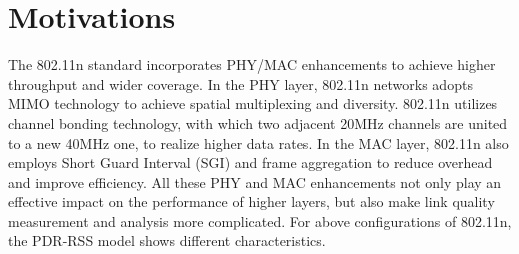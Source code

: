 \documentclass[draftclsnofoot,conference,onecolumn,11pt]{IEEEtran}
\begin{document}
%
%
%
%
%
%

\section{Motivations}

The 802.11n standard incorporates PHY/MAC enhancements to achieve higher throughput and wider coverage. In the PHY layer, 802.11n networks adopts MIMO technology to achieve spatial multiplexing and diversity. 802.11n utilizes channel bonding technology, with which two adjacent 20MHz channels are united to a new 40MHz one, to realize higher data rates. In the MAC layer, 802.11n also employs Short Guard Interval (SGI) and frame aggregation to reduce overhead and improve efficiency. All these PHY and MAC enhancements not only play an effective impact on the performance of higher layers, but also make link quality measurement and analysis more complicated. For above configurations of 802.11n, the PDR-RSS model shows different characteristics.

\end{document}
